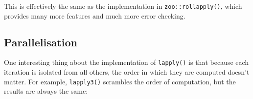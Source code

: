 \begin{Shaded}
\begin{Highlighting}[]
\StringTok{ }
  \StringTok{ }\StringTok{ }\NormalTok{)}
  \StringTok{ }\StringTok{ }\NormalTok{):(}\StringTok{ }\StringTok{ }\StringTok{ }\NormalTok{)}
  \StringTok{ }\NormalTok{(}
    \NormalTok{(x[(i -}\StringTok{ }\StringTok{ }\NormalTok{offset)], ...),}
    \NormalTok{(}\NormalTok{)}
  \NormalTok{)}

  \NormalTok{(}\NormalTok{(}
\NormalTok{\}}
\end{Highlighting}
\end{Shaded}

This is effectively the same as the implementation in
\texttt{zoo::rollapply()}, which provides many more features and much
more error checking.

\subsection{Parallelisation}

One interesting thing about the implementation of \texttt{lapply()} is
that because each iteration is isolated from all others, the order in
which they are computed doesn't matter. For example, \texttt{lapply3()}
scrambles the order of computation, but the results are always the same:
 

\begin{Shaded}
\begin{Highlighting}[]
\StringTok{ }
  \StringTok{ }\NormalTok{(}\NormalTok{, }
  \NormalTok{(}
    \StringTok{ }
  \NormalTok{\}}
\NormalTok{\}}
\NormalTok{(}\NormalTok{(}\NormalTok{:}
\NormalTok{(}\NormalTok{(}\NormalTok{:}
\end{Highlighting}
\end{Shaded}

